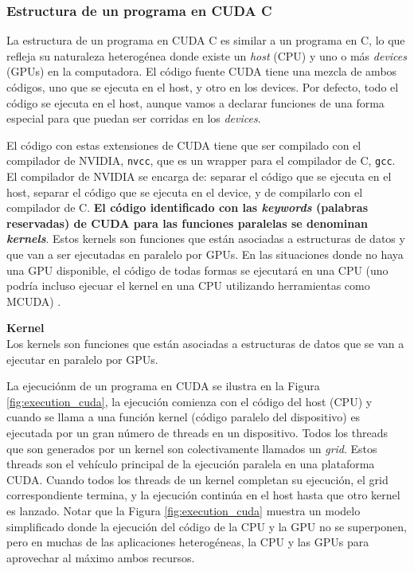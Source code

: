 \subsubsection{Estructura de un programa en CUDA C}

La estructura de un programa en CUDA C es similar a un programa en C, lo que refleja su naturaleza heterogénea donde
existe un \textit{host} (CPU) y uno o más \textit{devices} (GPUs) en la computadora. El código fuente CUDA tiene una
mezcla de ambos códigos, uno que se ejecuta en el host, y otro en los devices. Por defecto, todo el código se ejecuta en
el host, aunque vamos a declarar funciones de una forma especial para que puedan ser corridas en los \textit{devices}.

El código con estas extensiones de CUDA tiene que ser compilado con el compilador de NVIDIA, \texttt{nvcc}, que es un
wrapper para el compilador de C, \texttt{gcc}. El compilador de NVIDIA se encarga de: separar el código que se ejecuta en
el host, separar el código que se ejecuta en el device, y de compilarlo con el compilador de C. \textbf{El código
identificado con las \textit{keywords} (palabras reservadas) de CUDA para las funciones paralelas se denominan
\textit{kernels}}. Estos kernels son funciones que están asociadas a estructuras de datos y que van a ser ejecutadas en
paralelo por GPUs. En las situaciones donde no haya una GPU disponible, el código de todas formas se ejecutará en una
CPU (uno podría incluso ejecuar el kernel en una CPU utilizando herramientas como MCUDA) \cite{sutter2005}.

\begin{tcolorbox}[colback=mint,colframe=mint!75!black,arc=0pt,outer arc=0pt]
  \textbf{Kernel} \\

  Los kernels son funciones que están asociadas a estructuras de datos que se van a ejecutar en paralelo por GPUs.
\end{tcolorbox}

La ejecuciónm de un programa en CUDA se ilustra en la Figura \ref{fig:execution_cuda}, la ejecución comienza con el
código del host (CPU) y cuando se llama a una función kernel (código paralelo del dispositivo) es ejecutada por un gran
número de threads en un dispositivo. Todos los threads que son generados por un kernel son colectivamente llamados un
\textit{grid}. Estos threads son el vehículo principal de la ejecución paralela en una plataforma CUDA. Cuando todos los
threads de un kernel completan su ejecución, el grid correspondiente termina, y la ejecución continúa en el host hasta
que otro kernel es lanzado. Notar que la Figura \ref{fig:execution_cuda} muestra un modelo simplificado donde la
ejecución del código de la CPU y la GPU no se superponen, pero en muchas de las aplicaciones heterogéneas, la CPU y las
GPUs para aprovechar al máximo ambos recursos.

